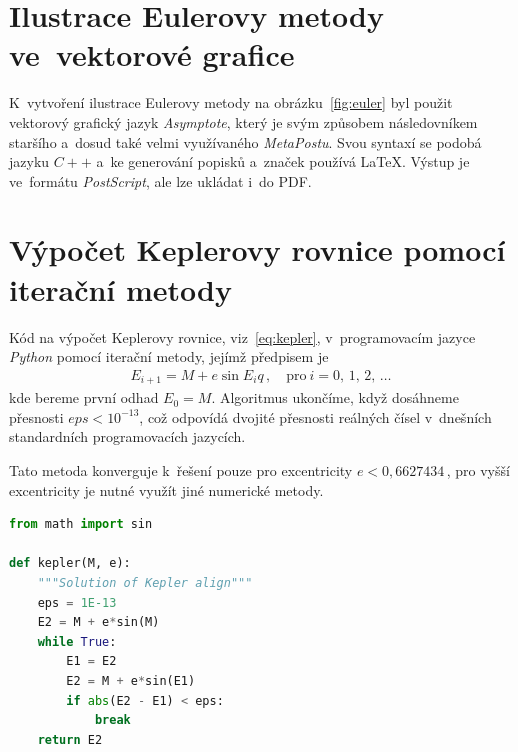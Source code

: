 \documentclass[A4paper, 12pt, oneside, openany]{book}
\begin{document}
\printbibliography
\begin{appendices}
	\chapter{Ilustrace Eulerovy metody ve~vektorové grafice} \label{app:asy}
	\begin{figure}[!htb]
	\centering
	\end{figure}

	K~vytvoření ilustrace Eulerovy metody na obrázku~\ref{fig:euler} byl použit vektorový grafický jazyk \textit{Asymptote}, který je svým způsobem následovníkem staršího a~dosud také velmi využívaného \textit{MetaPostu}. Svou syntaxí se podobá jazyku $C++$ a~ke generování popisků a~značek používá \LaTeX. Výstup je ve~formátu \textit{PostScript}, ale lze ukládat i~do PDF.



	\chapter{Výpočet Keplerovy rovnice pomocí iterační metody} \label{app:kepit}
	Kód na výpočet Keplerovy rovnice, viz~\eqref{eq:kepler}, v~programovacím jazyce \textit{Python} pomocí iterační metody, jejímž předpisem je
	\begin{align*}
		E_{i+1}=M+e\sin{E_i}q\,, \quad \text{pro}\ i=0,\,1,\,2,\,\ldots
	\end{align*}
	kde bereme první odhad $E_0=M$. Algoritmus ukončíme, když dosáhneme přesnosti ${eps<10^{-13}}$, což odpovídá dvojité přesnosti reálných čísel v~dnešních standardních programovacích jazycích.

	Tato metoda konverguje k~řešení pouze pro excentricity $e<0,6627434\,$, pro vyšší excentricity je nutné využít jiné numerické metody.
\begin{lstlisting}[language=Python]
from math import sin

def kepler(M, e):
    """Solution of Kepler align"""
    eps = 1E-13
    E2 = M + e*sin(M)
    while True:
        E1 = E2
        E2 = M + e*sin(E1)
        if abs(E2 - E1) < eps:
            break 
    return E2
\end{lstlisting}

\end{appendices}
\end{document}
